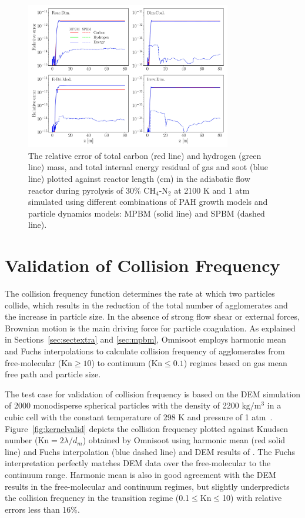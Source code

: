 \begin{figure}[H]
	\centering
	\includegraphics[width=0.8\textwidth]{Figures/Results/Validation/PFR/relerr_pfr.pdf}
	\caption{The relative error of total carbon (red line) and hydrogen (green line) mass, and total internal energy residual of gas and soot (blue line) plotted against reactor length (cm) in the adiabatic flow reactor during pyrolysis of 30\% $\mathrm{CH_4}$-$\mathrm{N_2}$ at 2100 K and 1 atm simulated using different combinations of PAH growth models and particle dynamics models: MPBM (solid line) and SPBM (dashed line).}
	\label{fig:pfrvalid}
\end{figure}


\section{Validation of Collision Frequency}
\label{sec:validcolfreq}
The collision frequency function determines the rate at which two particles collide, which results in the reduction of the total number of agglomerates and the increase in particle size. In the absence of strong flow shear or external forces, Brownian motion is the main driving force for particle coagulation. As explained in Sections~\ref{sec:sectextra} and \ref{sec:mpbm}, Omnisoot employs harmonic mean and Fuchs interpolations to calculate collision frequency of agglomerates from free-molecular ($\mathrm{Kn}\ge10$) to continuum ($\mathrm{Kn}\le0.1$) regimes based on gas mean free path and particle size. 


The test case for validation of collision frequency is based on the DEM simulation of 2000 monodisperse spherical particles with the density of 2200 $\mathrm{kg/m^3}$ in
a cubic cell with the constant temperature of 298 K and pressure of 1 atm~\citep{goudeli2015coagulation}. Figure~\ref{fig:kernelvalid} depicts the collision frequency plotted against Knudsen number (Kn$=2\lambda/d_m$) obtained by Omnisoot using harmonic mean (red solid line) and Fuchs interpolation (blue dashed line) and DEM results of \citet{goudeli2015coagulation}. The Fuchs interpretation perfectly matches DEM data over the free-molecular to the continuum range. Harmonic mean is also in good agreement with the DEM results in the free-molecular and continuum regimes, but slightly underpredicts the collision frequency in the transition regime (0.1$\le$Kn$\le$10) with relative errors less than 16\%.


